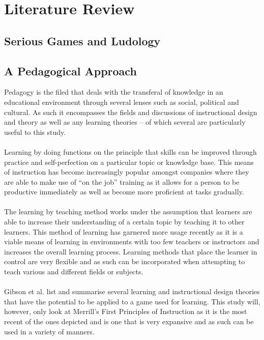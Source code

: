 \documentclass[conference]{IEEEtran}
\begin{document}
\section{Literature Review}
\subsection{Serious Games and Ludology}
\subsection{A Pedagogical Approach}
Pedagogy is the filed that deals with the transferal of knowledge in an educational environment through several lenses such as social, political and cultural\cite{Li2012}. As such it encompasses the fields and discussions of instructional design and theory as well as any learning theories – of which several are particularly useful to this study.
\\\\
Learning by doing functions on the principle that skills can be improved through practice and self-perfection on a particular topic or knowledge base\cite{Fisch2009}. This means of instruction has become increasingly popular amongst companies where they are able to make use of “on the job” training as it allows for a person to be productive immediately as well as become more proficient at tasks gradually\cite{Fisch2009}. 
\\\\
The learning by teaching method works under the assumption that learners are able to increase their understanding of a certain topic by teaching it to other learners\cite{Fisch2009}. This method of learning has garnered more usage recently as it is a viable means of learning in environments with too few teachers or instructors and increases the overall learning process\cite{Fisch2009}. Learning methods that place the learner in control are very flexible and as such can be incorporated when attempting to teach various and different fields or subjects\cite{Ackoff1991}. 
\\\\
Gibson et al.\cite{gibson2006games} list and summarise several learning and instructional design theories that have the potential to be applied to a game used for learning. This study will, however, only look at Merrill’s First Principles of Instruction as it is the most recent of the ones depicted  and is one that is very expansive and as such can be used in a variety of manners\cite{gibson2006games}.
\\\\
\end{document}

